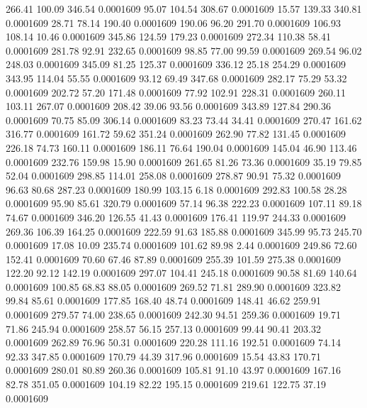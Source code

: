  266.41  100.09  346.54   0.0001609
  95.07  104.54  308.67   0.0001609
  15.57  139.33  340.81   0.0001609
  28.71   78.14  190.40   0.0001609
 190.06   96.20  291.70   0.0001609
 106.93  108.14   10.46   0.0001609
 345.86  124.59  179.23   0.0001609
 272.34  110.38   58.41   0.0001609
 281.78   92.91  232.65   0.0001609
  98.85   77.00   99.59   0.0001609
 269.54   96.02  248.03   0.0001609
 345.09   81.25  125.37   0.0001609
 336.12   25.18  254.29   0.0001609
 343.95  114.04   55.55   0.0001609
  93.12   69.49  347.68   0.0001609
 282.17   75.29   53.32   0.0001609
 202.72   57.20  171.48   0.0001609
  77.92  102.91  228.31   0.0001609
 260.11  103.11  267.07   0.0001609
 208.42   39.06   93.56   0.0001609
 343.89  127.84  290.36   0.0001609
  70.75   85.09  306.14   0.0001609
  83.23   73.44   34.41   0.0001609
 270.47  161.62  316.77   0.0001609
 161.72   59.62  351.24   0.0001609
 262.90   77.82  131.45   0.0001609
 226.18   74.73  160.11   0.0001609
 186.11   76.64  190.04   0.0001609
 145.04   46.90  113.46   0.0001609
 232.76  159.98   15.90   0.0001609
 261.65   81.26   73.36   0.0001609
  35.19   79.85   52.04   0.0001609
 298.85  114.01  258.08   0.0001609
 278.87   90.91   75.32   0.0001609
  96.63   80.68  287.23   0.0001609
 180.99  103.15    6.18   0.0001609
 292.83  100.58   28.28   0.0001609
  95.90   85.61  320.79   0.0001609
  57.14   96.38  222.23   0.0001609
 107.11   89.18   74.67   0.0001609
 346.20  126.55   41.43   0.0001609
 176.41  119.97  244.33   0.0001609
 269.36  106.39  164.25   0.0001609
 222.59   91.63  185.88   0.0001609
 345.99   95.73  245.70   0.0001609
  17.08   10.09  235.74   0.0001609
 101.62   89.98    2.44   0.0001609
 249.86   72.60  152.41   0.0001609
  70.60   67.46   87.89   0.0001609
 255.39  101.59  275.38   0.0001609
 122.20   92.12  142.19   0.0001609
 297.07  104.41  245.18   0.0001609
  90.58   81.69  140.64   0.0001609
 100.85   68.83   88.05   0.0001609
 269.52   71.81  289.90   0.0001609
 323.82   99.84   85.61   0.0001609
 177.85  168.40   48.74   0.0001609
 148.41   46.62  259.91   0.0001609
 279.57   74.00  238.65   0.0001609
 242.30   94.51  259.36   0.0001609
  19.71   71.86  245.94   0.0001609
 258.57   56.15  257.13   0.0001609
  99.44   90.41  203.32   0.0001609
 262.89   76.96   50.31   0.0001609
 220.28  111.16  192.51   0.0001609
  74.14   92.33  347.85   0.0001609
 170.79   44.39  317.96   0.0001609
  15.54   43.83  170.71   0.0001609
 280.01   80.89  260.36   0.0001609
 105.81   91.10   43.97   0.0001609
 167.16   82.78  351.05   0.0001609
 104.19   82.22  195.15   0.0001609
 219.61  122.75   37.19   0.0001609
